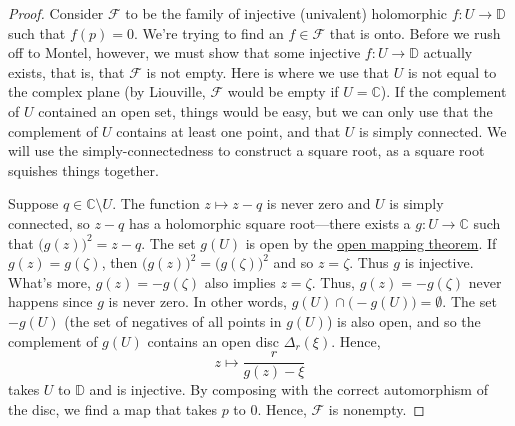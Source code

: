 \documentclass[12pt,openany]{book}
\newcommand{\C}{{\mathbb{C}}}
\newcommand{\D}{{\mathbb{D}}}
\newcommand{\sF}{{\mathscr{F}}}
\theoremstyle{plain}
\theoremstyle{remark}
\theoremstyle{definition}
\theoremstyle{exercise}
\theoremstyle{example}
\begin{document}
\begin{proof}
Consider $\sF$ to be the family of injective (univalent) holomorphic
$f \colon U \to \D$ such that $f(p) = 0$.  We're trying to find
an $f \in \sF$ that is onto.
Before we rush off to Montel, however, we must show that some
injective
$f \colon U \to \D$ actually exists,
that is, that $\sF$ is not empty.  Here is where we
use that $U$ is not equal to the complex plane (by Liouville, $\sF$
would be empty if $U = \C$).  If the complement of $U$ contained an open
set, things would be easy, but we can only use that the complement of $U$
contains at least one point, and that $U$ is simply connected.  We will use
the simply-connectedness to construct a square root, as a square root squishes
things together.

Suppose $q \in \C \setminus U$.  The function $z \mapsto z-q$ is never
zero and $U$ is simply connected, so $z-q$ has a holomorphic square
root---there exists a $g \colon U \to \C$ such that
${\bigl(g(z)\bigr)}^2 = z-q$.
The set $g(U)$ is open by the \hyperref[thm:OMT]{open mapping theorem}.
If $g(z)=g(\zeta)$, then ${\bigl(g(z)\bigr)}^2={\bigl(g(\zeta)\bigr)}^2$ and so
$z=\zeta$.  Thus $g$ is injective.  What's more,
$g(z)=-g(\zeta)$ also implies $z=\zeta$.  Thus, $g(z) =
-g(\zeta)$ never happens since $g$ is never zero.
In other words, $g(U) \cap \bigl( - g(U) \bigr) = \emptyset$.  The set
$- g(U)$ (the set of negatives of all points in $g(U)$) is also open, and so
the complement of $g(U)$ contains an open disc $\Delta_r(\xi)$.  Hence,
\begin{equation*}
z \mapsto \frac{r}{g(z)-\xi}
\end{equation*}
takes $U$ to $\D$ and is injective.
By composing with the correct automorphism of the disc,
we find a map that takes $p$ to $0$.  Hence, $\sF$ is nonempty.


\end{proof}
\end{document}
